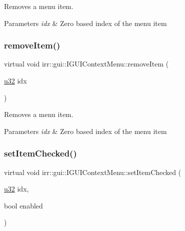 Removes a menu item. 


\begin{DoxyParams}{Parameters}
{\em idx} & Zero based index of the menu item \\
\hline
\end{DoxyParams}
\mbox{\label{classirr_1_1gui_1_1IGUIContextMenu_af8cc0fc0f430044a318d4597f8535e9b}} 
\subsubsection{\texorpdfstring{remove\+Item()}{removeItem()}\hspace{0.1cm}{\footnotesize\ttfamily [2/2]}}
{\footnotesize\ttfamily virtual void irr\+::gui\+::\+I\+G\+U\+I\+Context\+Menu\+::remove\+Item (\begin{DoxyParamCaption}\item[{\hyperlink{namespaceirr_a0416a53257075833e7002efd0a18e804}{u32}}]{idx }\end{DoxyParamCaption})\hspace{0.3cm}{\ttfamily [pure virtual]}}



Removes a menu item. 


\begin{DoxyParams}{Parameters}
{\em idx} & Zero based index of the menu item \\
\hline
\end{DoxyParams}
\mbox{\label{classirr_1_1gui_1_1IGUIContextMenu_a8abbd1587dcc462f60660d7e606e954e}} 
\subsubsection{\texorpdfstring{set\+Item\+Checked()}{setItemChecked()}\hspace{0.1cm}{\footnotesize\ttfamily [1/2]}}
{\footnotesize\ttfamily virtual void irr\+::gui\+::\+I\+G\+U\+I\+Context\+Menu\+::set\+Item\+Checked (\begin{DoxyParamCaption}\item[{\hyperlink{namespaceirr_a0416a53257075833e7002efd0a18e804}{u32}}]{idx,  }\item[{bool}]{enabled }\end{DoxyParamCaption})\hspace{0.3cm}{\ttfamily [pure virtual]}}



